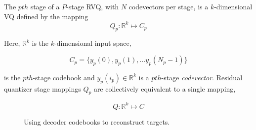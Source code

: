 \documentclass{article}
\begin{document}
The $pth$ stage of a $P$-stage RVQ, with $N$ codevectors per stage, is a $k$-dimensional VQ defined by the mapping 
\begin{equation}
Q_p : \mathbb{R}^k \mapsto C_p
\end{equation}
  
Here, $\mathbb{R}^k$ is the $k$-dimensional input space,   

\begin{equation}
C_p = \{y_p(0), y_p(1), \ldots y_p(N_p - 1) \}
\end{equation}

is the $pth$-stage codebook and $y_p(i_p) \in \mathbb{R}^k$ is a $pth$-stage \emph{codevector}.  
Residual quantizer stage mappings $Q_p$ are collectively equivalent to a single mapping,

\begin{equation}
Q : \mathbb{R}^k \mapsto C
\end{equation}

\begin{figure}%
			\centering	
			\caption{Using decoder codebooks to reconstruct targets.} 
			\label{fig:Codebooks_and_reconstruction}				
\end{figure}
\end{document}
